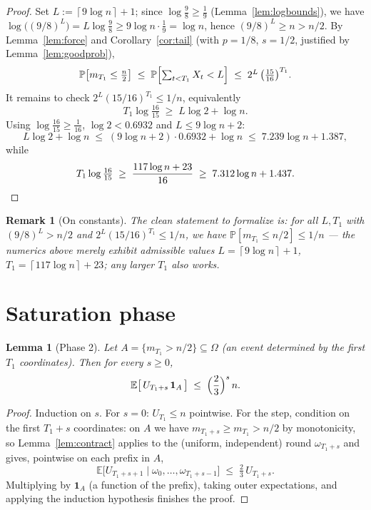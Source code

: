 \documentclass[11pt]{article}
\newtheorem{lemma}[theorem]{Lemma}
\newtheorem{remark}[theorem]{Remark}
\newcommand{\E}{\mathbb{E}}
\renewcommand{\Pr}{\mathbb{P}}
\newcommand{\ceil}[1]{\left\lceil #1 \right\rceil}
\begin{document}
\begin{proof}
Set $L := \ceil{9 \log n} + 1$; since $\log\tfrac98 \ge \tfrac19$
(Lemma~\ref{lem:logbounds}), we have
$\log\bigl((9/8)^L\bigr) = L\log\tfrac98 \ge 9\log n \cdot \tfrac19 = \log n$,
hence $(9/8)^L \ge n > n/2$.  By Lemma~\ref{lem:force}
and Corollary~\ref{cor:tail} (with $p = 1/8$, $s = 1/2$, justified by
Lemma~\ref{lem:goodprob}),
\[
  \Pr\bigl[m_{T_1} \le \tfrac n2\bigr]
  \;\le\; \Pr\Bigl[\textstyle\sum_{t<T_1} X_t < L\Bigr]
  \;\le\; 2^{L}\,\bigl(\tfrac{15}{16}\bigr)^{T_1}.
\]
It remains to check $2^L (15/16)^{T_1} \le 1/n$, equivalently
\[
  T_1 \log\tfrac{16}{15} \;\ge\; L \log 2 + \log n .
\]
Using $\log\frac{16}{15} \ge \tfrac1{16}$, $\log 2 < 0.6932$ and
$L \le 9\log n + 2$:
\[
  L\log 2 + \log n \;\le\; (9 \log n + 2)\cdot 0.6932 + \log n
  \;\le\; 7.239 \log n + 1.387 ,
\]
while
\[
  T_1 \log\tfrac{16}{15} \;\ge\; \frac{117\log n + 23}{16}
  \;\ge\; 7.312 \log n + 1.437 . \qedhere
\]
\end{proof}

\begin{remark}[On constants]\label{rem:constants}
The clean statement to formalize is: \emph{for all $L, T_1$ with
$(9/8)^L > n/2$ and $2^L (15/16)^{T_1} \le 1/n$, we have
$\Pr[m_{T_1} \le n/2] \le 1/n$} --- the numerics above merely exhibit
admissible values $L = \ceil{9\log n} + 1$, $T_1 = \ceil{117\log n} + 23$;
any larger $T_1$ also works.
\end{remark}

\section{Saturation phase}\label{sec:saturation}

\begin{lemma}[Phase 2]\label{lem:phase2}
Let $A = \{m_{T_1} > n/2\} \subseteq \Omega$ (an event determined by the
first $T_1$ coordinates).  Then for every $s \ge 0$,
\[
  \E\bigl[\, U_{T_1 + s}\, \mathbf{1}_A \,\bigr]
  \;\le\; \Bigl(\frac23\Bigr)^{s}\, n .
\]
\end{lemma}

\begin{proof}
Induction on $s$.  For $s = 0$: $U_{T_1} \le n$ pointwise.  For the step,
condition on the first $T_1 + s$ coordinates: on $A$ we have $m_{T_1+s} \ge
m_{T_1} > n/2$ by monotonicity, so Lemma~\ref{lem:contract} applies to the
(uniform, independent) round $\omega_{T_1+s}$ and gives, pointwise on each
prefix in $A$,
\[
  \E\bigl[U_{T_1+s+1} \mid \omega_0,\dots,\omega_{T_1+s-1}\bigr]
  \;\le\; \tfrac23\, U_{T_1+s} .
\]
Multiplying by $\mathbf{1}_A$ (a function of the prefix), taking outer
expectations, and applying the induction hypothesis finishes the proof.
\end{proof}
\end{document}
